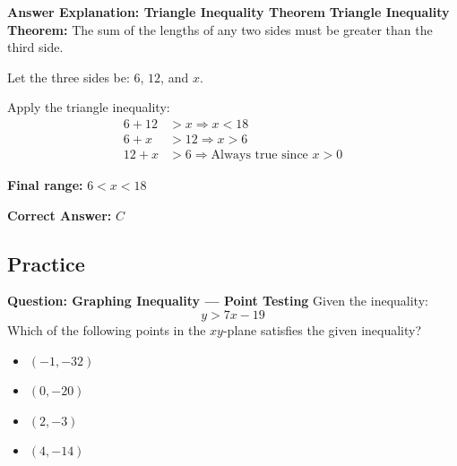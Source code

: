 \documentclass{beamer}
\begin{document}
\begin{frame}{\textbf{Answer Explanation: Triangle Inequality Theorem}}
    \small
    \textbf{Triangle Inequality Theorem:} The sum of the lengths of any two sides must be greater than the third side.

    Let the three sides be: \(6\), \(12\), and \(x\).

    Apply the triangle inequality:
    \begin{align*}
    6 + 12 &> x \Rightarrow x < 18 \\
    6 + x &> 12 \Rightarrow x > 6 \\
    12 + x &> 6 \Rightarrow \text{Always true since } x > 0
    \end{align*}

    \textbf{Final range:} \(6 < x < 18\)

    \textbf{Correct Answer:} \( \boxed{C} \)
\end{frame}

\begin{frame}
    \section{Practice}
\end{frame}

\begin{frame}{\textbf{Question: Graphing Inequality — Point Testing}}
    Given the inequality:
    \[
    y > 7x - 19
    \]
    Which of the following points in the \(xy\)-plane satisfies the given inequality?

    \vspace{1em}
    \begin{itemize}
        \item[\textbf{A.}] \((-1, -32)\)
        \item[\textbf{B.}] \((0, -20)\)
        \item[\textbf{C.}] \((2, -3)\)
        \item[\textbf{D.}] \((4, -14)\)
    \end{itemize}
\end{frame}
\end{document}
